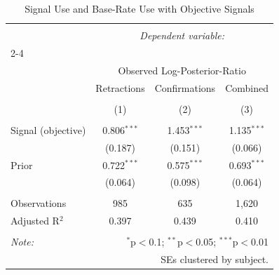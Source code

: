 
\begin{table}[!htbp] \centering 
  \caption{Signal Use and Base-Rate Use with Objective Signals} 
  \label{} 
\begin{tabular}{@{\extracolsep{5pt}}lccc} 
\\[-1.8ex]\hline 
\hline \\[-1.8ex] 
 & \multicolumn{3}{c}{\textit{Dependent variable:}} \\ 
\cline{2-4} 
\\[-1.8ex] & \multicolumn{3}{c}{Observed Log-Posterior-Ratio} \\ 
 & Retractions & Confirmations & Combined \\ 
\\[-1.8ex] & (1) & (2) & (3)\\ 
\hline \\[-1.8ex] 
 Signal (objective) & 0.806$^{***}$ & 1.453$^{***}$ & 1.135$^{***}$ \\ 
  & (0.187) & (0.151) & (0.066) \\ 
  Prior & 0.722$^{***}$ & 0.575$^{***}$ & 0.693$^{***}$ \\ 
  & (0.064) & (0.098) & (0.064) \\ 
 \hline \\[-1.8ex] 
Observations & 985 & 635 & 1,620 \\ 
Adjusted R$^{2}$ & 0.397 & 0.439 & 0.410 \\ 
\hline 
\hline \\[-1.8ex] 
\textit{Note:}  & \multicolumn{3}{r}{$^{*}$p$<$0.1; $^{**}$p$<$0.05; $^{***}$p$<$0.01} \\ 
 & \multicolumn{3}{r}{SEs clustered by subject.} \\ 
\end{tabular} 
\end{table} 
